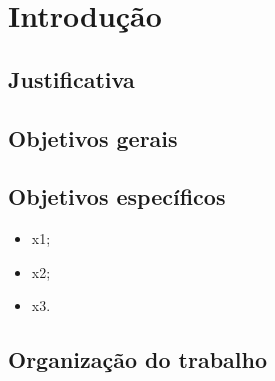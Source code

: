 \chapter{Introdução} \label{ch:Introdução}


\section{Justificativa}



\section{Objetivos gerais}


\section{Objetivos específicos}

\begin{itemize}
	\item x1;
    \item x2;
    \item x3.
\end{itemize}

\section{Organização do trabalho}

